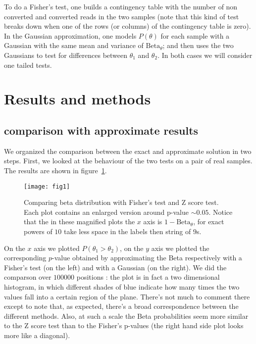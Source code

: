 \documentclass[11pt]{amsart}
\newcommand{\betapdf}{\mbox{Beta}_\theta}
\begin{document}
To do a Fisher's test, one builds a contingency table with the number of non converted and converted reads in the two samples (note that this kind of test breaks down when one of the rows (or columns) of the contingency table is zero). In the Gaussian approximation, one models $P(\theta)$ for each sample with a Gaussian with the same mean and variance of $\betapdf$; and then uses the two Gaussians to test for differences between $\theta_1$ and $\theta_2$. In both cases we will consider one tailed tests. 
\section{Results and methods} 
\subsection{comparison with approximate results}
We organized the comparison between the exact and approximate solution in two steps. First,
we looked at the behaviour of the two tests on a pair of real samples. The results are shown in figure~\ref{cmpreal}.
\begin{figure}[h]
\caption{Comparing beta distribution with Fisher's test and Z score test. Each plot contains an enlarged version around p-value $\sim 0.05$. Notice that the in these magnified plots the $x$ axis is $1-\betapdf$, for exact powers of $10$ take less space in the labels then string of $9$s.}
\texttt{[image: fig1]}
\label{cmpreal}
\end{figure}
On the $x$ axis we plotted $P(\theta_1>\theta_2)$, on the $y$ axis we plotted the corresponding $p$-value obtained by approximating the Beta respectively with a Fisher's test (on the left) and with a Gaussian (on the right).
We did the comparson over $100000$ positions : the plot is in fact a two dimensional histogram, in which different shades of blue indicate how many times the two values fall into a certain region of the plane. There's not much to comment there except to note that, as expected, there's a broad correspondence between the different methods. Also, at such a scale the Beta probabilities seem more similar to the Z score test than to the Fisher's p-values (the right hand side plot looks more like a diagonal). 
\end{document}
